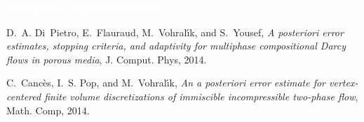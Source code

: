 \documentclass[10 pt]{beamer}
\begin{document}
\begin{frame}
\begin{block}{
\scriptsize{
\textcolor{white}{\textbf{Multiphase compositional flows}}
}}
\scriptsize{
 \begin{thebibliography}{10}


{\sc D.~A. Di~Pietro, E.~Flauraud, M.~Vohral{\'{\i}}k, and S.~Yousef}, {\em A
  posteriori error estimates, stopping criteria, and adaptivity for multiphase
  compositional {D}arcy flows in porous media}, J. Comput. Phys, 2014.

{\sc C.~Canc\`es, I.~S. Pop, and M.~Vohral{\'{\i}}k}, {\em An a posteriori error
  estimate for vertex-centered finite volume discretizations of immiscible
  incompressible two-phase flow}, Math. Comp, 2014.
\end{thebibliography}
}
\end{block}

\end{frame}
\end{document}
